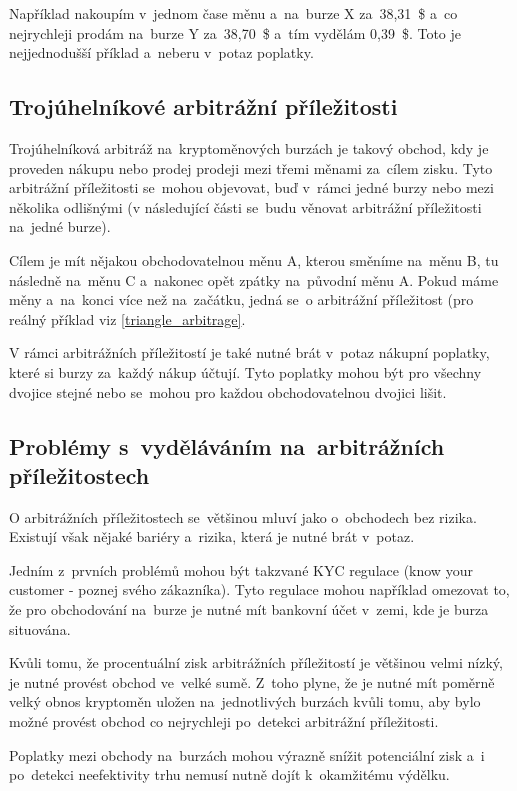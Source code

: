 \documentclass[thesis=B,czech]{FITthesis}[2019/03/21]
\begin{document}
Například nakoupím v~jednom čase měnu a~na~burze X za~38,31~\$ a~co nejrychleji prodám na~burze Y za~38,70~\$ a~tím vydělám 0,39~\$. Toto je nejjednodušší příklad a~neberu v~potaz poplatky. 

\subsection{Trojúhelníkové arbitrážní příležitosti}
Trojúhelníková arbitráž na~kryptoměnových burzách je takový obchod, kdy je proveden nákupu nebo prodej prodeji mezi třemi měnami za~cílem zisku. Tyto arbitrážní příležitosti se~mohou objevovat, buď v~rámci jedné burzy nebo mezi několika odlišnými (v následující části se~budu věnovat arbitrážní příležitosti na~jedné burze). \cite{TradingStrategy}

Cílem je mít nějakou obchodovatelnou měnu A, kterou směníme na~měnu B, tu následně na~měnu C a~nakonec opět zpátky na~původní měnu A. Pokud máme měny a~na~konci více než na~začátku, jedná se~o arbitrážní příležitost (pro reálný příklad viz \ref{triangle_arbitrage}.

V rámci arbitrážních příležitostí je také nutné brát v~potaz nákupní poplatky, které si burzy za~každý nákup účtují. Tyto poplatky mohou být pro všechny dvojice stejné nebo se~mohou pro každou obchodovatelnou dvojici lišit.  

\subsection{Problémy s~vyděláváním na~arbitrážních příležitostech}
O arbitrážních příležitostech se~většinou mluví jako o~obchodech bez rizika. Existují však nějaké bariéry a~rizika, která je nutné brát v~potaz.

Jedním z~prvních problémů mohou být takzvané KYC regulace (know your customer - poznej svého zákazníka). Tyto regulace mohou například omezovat to, že pro obchodování na~burze je nutné mít bankovní účet v~zemi, kde je burza situována.

Kvůli tomu, že procentuální zisk arbitrážních příležitostí je většinou velmi nízký, je nutné provést obchod ve~velké sumě. Z~toho plyne, že je nutné mít poměrně velký obnos kryptoměn uložen na~jednotlivých burzách kvůli tomu, aby bylo možné provést obchod co nejrychleji po~detekci arbitrážní příležitosti. 

Poplatky mezi obchody na~burzách mohou výrazně snížit potenciální zisk a~i po~detekci neefektivity trhu nemusí nutně dojít k~okamžitému výdělku.  
\end{document}
